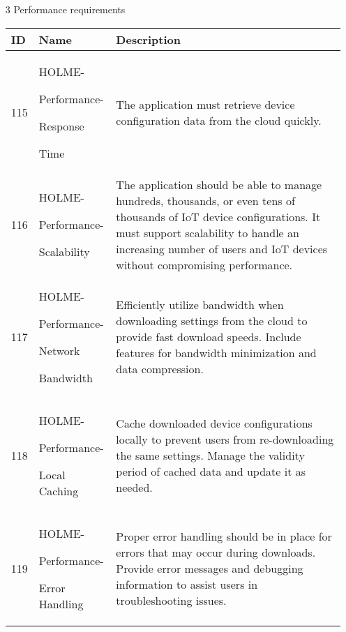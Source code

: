 \documentclass[conference]{IEEEtran}
\begin{document}
\begin{enumerate}
\item[3] Performance requirements
\begin{table}[h]
\def\arraystretch{1.2} \small
    \begin{tabular}{|p{1cm}|p{1.8cm}|p{5.0cm}|}
        \hline
        ID & Name & Description\\ \hline
        115 \par  & HOLME-\par Performance-\par Response \par Time  &The application must retrieve device configuration data from the cloud quickly.  \\ \hline
        116 \par  & HOLME-\par Performance-\par Scalability & The application should be able to manage hundreds, thousands, or even tens of thousands of IoT device configurations. It must support scalability to handle an increasing number of users and IoT devices without compromising performance. \\ \hline
        117 \par  & HOLME-\par Performance-\par Network \par Bandwidth & Efficiently utilize bandwidth when downloading settings from the cloud to provide fast download speeds. Include features for bandwidth minimization and data compression. \\ \hline
        118 \par  & HOLME-\par Performance-\par Local Caching & Cache downloaded device configurations locally to prevent users from re-downloading the same settings. Manage the validity period of cached data and update it as needed. \\ \hline
         119 \par  & HOLME-\par Performance-\par Error Handling & Proper error handling should be in place for errors that may occur during downloads. Provide error messages and debugging information to assist users in troubleshooting issues. \\ \hline
    \end{tabular}
\end{table}
\vspace{3cm}


\end{enumerate}
\end{document}
